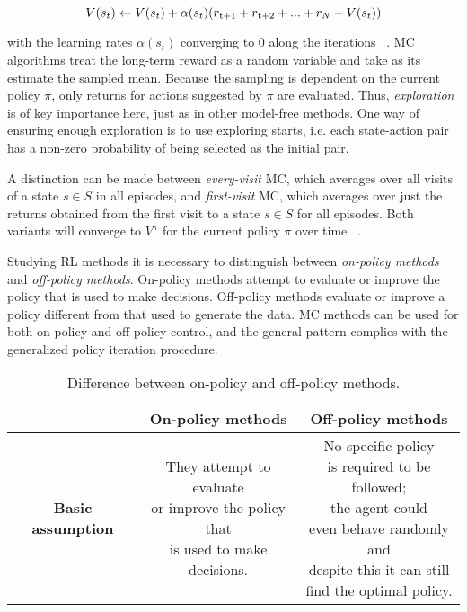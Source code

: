 \begin{equation} 
\label{eq:2.6}
V(s_t) \leftarrow V(s_t) + \alpha(s_t)(r\textsubscript{t+1} + r\textsubscript{t+2} + ... + r_N - V(s_t))
\end{equation}

with the learning rates $\alpha(s_t)$ converging to $0$ along the iterations~\cite{Sigaud:2010:MDP:1841781} . MC algorithms treat the long-term reward as a random variable and take as its estimate the sampled mean. Because the sampling is dependent on the current policy $\pi$, only returns for actions suggested by $\pi$ are evaluated. Thus, \textit{exploration} is of key importance here, just as in other model-free methods. One way of ensuring enough exploration is to use exploring starts, i.e. each state-action pair has a non-zero probability of being selected as the initial pair.

A distinction can be made between \textit{every-visit} MC, which averages over all visits of a state $s \in S$ in all episodes, and \textit{first-visit} MC, which averages over just the returns obtained from the first visit to a state $s \in S$ for all episodes. Both variants will
converge to $V^\pi$ for the current policy $\pi$ over time~\cite{wiering2012reinforcement} .

Studying RL methods it is necessary to distinguish between \textit{on-policy methods} and \textit{off-policy methods}.
On-policy methods attempt to evaluate or improve the policy that is used to make decisions. Off-policy methods evaluate or improve a policy different from that used to generate the data. MC methods can be used for both on-policy and off-policy control, and the general pattern complies with the generalized policy iteration procedure. 

\begin{table}
\centering
\begin{tabular}{|c|c|c|}
	\hline 
	&\textbf{On-policy methods}  &\textbf{Off-policy methods}  \\ 
	\hline \textbf{Basic assumption}
	& \thead{They attempt to evaluate\\ or improve the policy that\\ is used to make decisions.}  &\thead{No specific policy \\ is required to be followed; \\ the agent could \\ even behave randomly and \\ despite this it can still  \\ find the optimal policy. }  \\ 
	\hline 
\end{tabular}
\caption{Difference between on-policy and off-policy methods.}
\end{table} 

